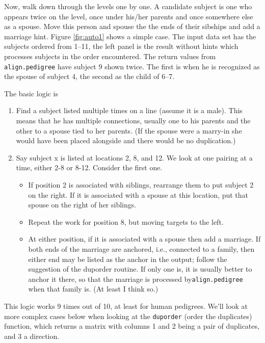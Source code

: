 \documentclass{article}
\begin{document}
Now, walk down through the levels one by one.
A candidate subject is one who appears twice on the level, once
under his/her parents and once somewhere else as a spouse.
Move this person and spouse the the ends of their sibships and
add a marriage hint.
Figure \ref{fig:auto1} shows a simple case.  The input data set has
the subjects ordered from 1--11, the left panel is the result without
hints which processes subjects in the order encountered.
The return values from \Verb!align.pedigree! have subject 9 shown twice.
The first is when he is recognized as the spouse of subject 4, the second
as the child of 6--7.

The basic logic is
\begin{enumerate}
  \item Find a subject listed multiple times on a line (assume it is a male).
    This means that he has multiple connections, usually one to his parents and
    the other to a spouse tied to her parents.  (If the
    spouse were a marry-in she would have been placed alongside and there
    would be no duplication.)
  \item Say subject x is listed at locations 2, 8, and 12.  We look at one
    pairing at a time, either 2-8 or 8-12.  Consider the first one.
    \begin{itemize}
      \item If position 2 is associated with siblings, rearrange them to
        put subject 2 on the right.  If it is associated with a spouse at
        this location, put that spouse on the right of her siblings.
      \item Repeat the work for position 8, but moving targets to the left.
      \item At either position, if it is associated with a spouse then
        add a marriage.  If both ends of the marriage are anchored, i.e.,
        connected to a family, then either end may be listed as the anchor
        in the output; follow the suggestion of the duporder routine.  If
        only one is, it is usually better to anchor it there, so that the
        marriage is processed by\Verb!align.pedigree! when that family is.
        (At least I think so.)
    \end{itemize}
\end{enumerate}
This logic works 9 times out of 10, at least for human pedigrees.
We'll look at more complex cases below when looking at the \Verb!duporder!   %
(order the duplicates)
function, which returns a matrix with columns 1 and 2 being a pair
of duplicates, and 3 a direction.
\end{document}
